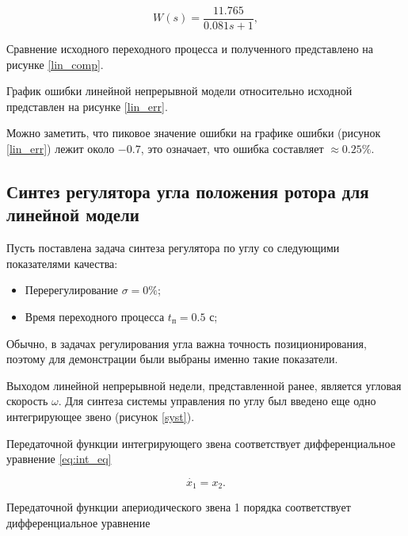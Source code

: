 \begin{equation}
  W(s)=\frac{11.765}{0.081s+1},
  \label{eq:lin_dbm}
\end{equation}

Сравнение исходного переходного процесса и полученного представлено на рисунке \ref{lin_comp}.


График ошибки линейной непрерывной модели относительно исходной представлен на рисунке \ref{lin_err}.


Можно заметить, что пиковое значение ошибки на графике ошибки (рисунок \ref{lin_err})
лежит около $-0.7$, это означает, что ошибка составляет
$\approx0.25\%$.

\subsection{Синтез регулятора угла положения ротора для линейной модели}

Пусть поставлена задача синтеза регулятора по углу со следующими показателями качества:

\begin{itemize}
  \item Перерегулирование $\sigma = 0\%$;
  \item Время переходного процесса $t_{\text{п}}=0.5$ с;
\end{itemize}

Обычно, в задачах регулирования угла важна точность позиционирования, поэтому для демонстрации
были выбраны именно такие показатели.

Выходом линейной непрерывной недели, представленной ранее, является угловая скорость $\omega$.
Для синтеза системы управления по углу был введено еще одно интегрирующее 
звено (рисунок \ref{syst}).


Передаточной функции интегрирующего звена соответствует дифференциальное уравнение \ref{eq:int_eq}

\begin{equation}
  \dot{x_1}=x_2.
  \label{eq:int_eq}
\end{equation}

Передаточной функции апериодического звена 1 порядка соответствует дифференциальное уравнение

